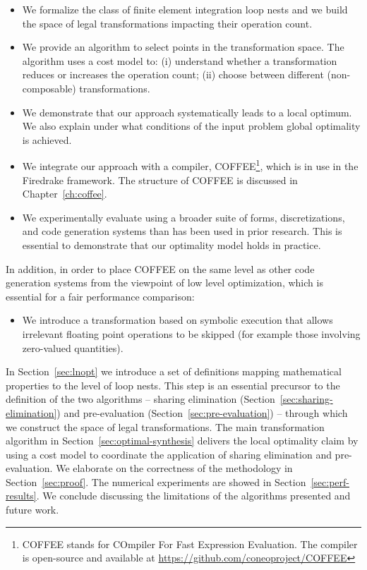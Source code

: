 \begin{itemize}
\item We formalize the class of finite element integration loop nests and we build the space of legal transformations impacting their operation count.
\item We provide an algorithm to select points in the transformation space. The algorithm uses a cost model to: (i) understand whether a transformation reduces or increases the operation count; (ii) choose between different (non-composable) transformations.
\item We demonstrate that our approach systematically leads to a local optimum. We also explain under what conditions of the input problem global optimality is achieved.
\item We integrate our approach with a compiler, COFFEE\footnote{COFFEE stands for COmpiler For Fast Expression Evaluation. The compiler is open-source and available at \url{https://github.com/coneoproject/COFFEE}}, which is in use in the Firedrake framework. The structure of COFFEE is discussed in Chapter~\ref{ch:coffee}.
\item We experimentally evaluate using a broader suite of forms, discretizations, and code generation systems than has been used in prior research. This is essential to demonstrate that our optimality model holds in practice.
\end{itemize}

In addition, in order to place COFFEE on the same level as other code generation systems from the viewpoint of low level optimization, which is essential for a fair performance comparison:

\begin{itemize}
\item We introduce a transformation based on symbolic execution that allows irrelevant floating point operations to be skipped (for example those involving zero-valued quantities).
\end{itemize}

In Section~\ref{sec:lnopt} we introduce a set of definitions mapping mathematical properties to the level of loop nests. This step is an essential precursor to the definition of the two algorithms -- sharing elimination (Section~\ref{sec:sharing-elimination}) and pre-evaluation (Section~\ref{sec:pre-evaluation}) -- through which we construct the space of legal transformations. The main transformation algorithm in Section~\ref{sec:optimal-synthesis} delivers the local optimality claim by using a cost model to coordinate the application of sharing elimination and pre-evaluation. We elaborate on the correctness of the methodology in Section~\ref{sec:proof}. The numerical experiments are showed in Section~\ref{sec:perf-results}. We conclude discussing the limitations of the algorithms presented and future work. 


